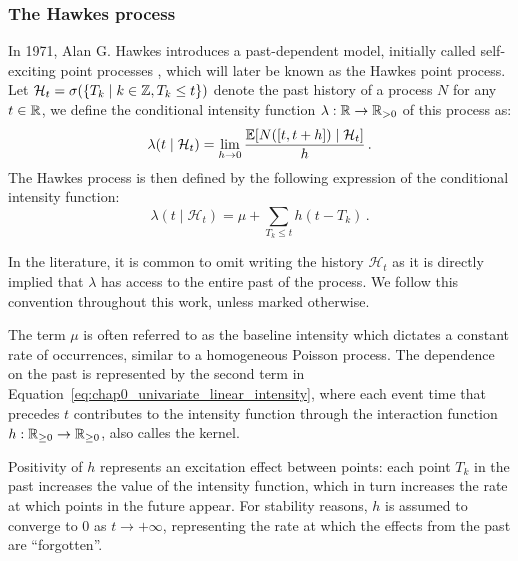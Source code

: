     \subsubsection{The Hawkes process}
    In 1971, Alan G. Hawkes introduces a past-dependent model, initially called self-exciting point processes \parencite{Hawkes1971}, which will later be known as the Hawkes point process.
    Let $\mathcal{H}_t = \sigma(\{T_k \mid k\in{\mathbb Z}, T_k \leq t\})$ denote the past history of a process $N$ for any $t\in{\mathbb R}$, we define the conditional intensity function $\lambda:{\mathbb R}\to{\mathbb R}_{>0}$ of this process as:
    \[        \lambda(t \mid \mathcal{H}_t) = \lim_{h \to 0}{\frac{{\mathbb E}[N([t,t+h]) \mid \mathcal{H}_t]}{h}}\,.
    \]
    The Hawkes process is then defined by the following expression of the conditional intensity function:
    \begin{equation}\label{eq:chap0_univariate_linear_intensity}
        \lambda(t\mid \mathcal{H}_t) = \mu + \sum_{T_k \leq t}{h(t-T_k)}\,.
    \end{equation}

    \begin{remark}
      In the literature, it is common to omit writing the history $\mathcal{H}_t$ as it is directly implied that $\lambda$ has access to the entire past of the process.
      We follow this convention throughout this work, unless marked otherwise.
    \end{remark}

    The term $\mu$ is often referred to as the baseline intensity which dictates a constant rate of occurrences, similar to a homogeneous Poisson process. 
    The dependence on the past is represented by the second term in Equation~\eqref{eq:chap0_univariate_linear_intensity}, where each event time that precedes $t$ contributes to the intensity function through the interaction function $h:{\mathbb R}_{\geq0}\to{\mathbb R}_{\geq0}$, also calles the kernel.

    Positivity of $h$ represents an excitation effect between points: each point $T_k$ in the past increases the value of the intensity function, which in turn increases the rate at which points in the future appear.
    For stability reasons, $h$ is assumed to converge to $0$ as $t\to+\infty$, representing the rate at which the effects from the past are ``forgotten''.

